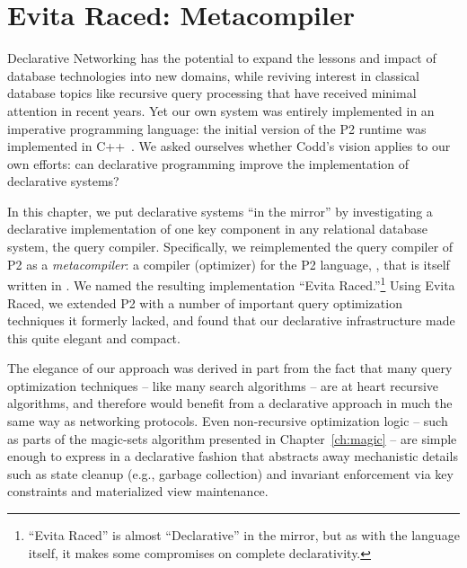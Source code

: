 \chapter[Evita Raced: \OVERLOG Metacompiler]{Evita Raced: \OVERLOG Metacompiler}
\label{ch:evita}

Declarative Networking has the potential to expand the lessons and impact of
database technologies into new domains, while reviving interest in classical
database topics like recursive query processing that have received minimal
attention in recent years.  Yet our own system was entirely implemented in an
imperative programming language: the initial version of the P2 runtime was
implemented in C++~\cite{p2:sosp}.  We asked ourselves whether Codd's vision
applies to our own efforts: can declarative programming improve the
implementation of declarative systems?

In this chapter, we put declarative systems ``in the mirror'' by investigating
a declarative implementation of one key component in any relational database
system, the query compiler.  Specifically, we reimplemented the query
compiler of P2 as a {\em metacompiler}: a compiler (optimizer) for the P2
language, \OVERLOG, that is itself written in \OVERLOG.  We named the resulting
implementation ``Evita Raced.''\footnote{``Evita Raced'' is almost
``Declarative'' in the mirror, but as with the \OVERLOG language itself, it
makes some compromises on complete declarativity.} Using Evita Raced, we
extended P2 with a number of important query optimization techniques it
formerly lacked, and found that our declarative infrastructure made this quite
elegant and compact.  

The elegance of our approach was derived in part from the fact that many query
optimization techniques -- like many search algorithms -- are at heart
recursive algorithms, and therefore would benefit from a declarative approach
in much the same way as networking protocols.  Even non-recursive optimization
logic -- such as parts of the magic-sets algorithm presented in
Chapter~\ref{ch:magic} -- are simple enough to express in a declarative fashion
that abstracts away mechanistic details such as state cleanup (e.g., garbage
collection) and invariant enforcement via key constraints and materialized view
maintenance.

